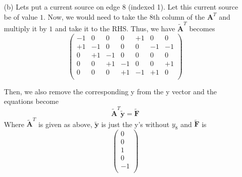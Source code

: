 \documentclass{article}
\newcommand{\mA}{\mathbf{A}}
\newcommand{\mC}{\mathbf{C}}
\newcommand{\mI}{\mathbf{I}}
\newcommand{\vy}{\mathbf{y}}
\newcommand{\vF}{\mathbf{F}}
\begin{document}
{\begin{itemize}
\[        \]
        Now we can see that we cannot write any column vector as a linear combination of the other column vectors. Therefore, the columns are independent.
        Matrix $\mC$ is a idenitity matrix since the resistors are all 1. Therefore, $\mC = \mI$.
        Therefore, $\tilde{\mA}^T \mC \tilde{\mA} = \tilde{\mA}^T \mI \tilde{\mA} = \tilde{\mA}^T \tilde{\mA}$ and this evaluates to 
        \[
            \begin{pmatrix}
            2 & -1 & 0 & 0 \\
            -1 & 4 & -1 & 0 \\
            0 & -1 & 3 & -1 \\
            0 & -1 & -1 & 3 \\
            \end{pmatrix}
        \]
        This is clearly symmetric. I then used Python to compute the eigen values of this matrix and found them to be $5, 2, 1, 4$. These are all positive and real, thus the matrix is positive definite.

        \item[(b)] Lets put a current source on edge 8 (indexed 1). Let this current source be of value $1$. Now, we would need to take the 8th column of the $\mA^T$ and multiply it by $1$ and take it to the RHS. Thus, we have $\tilde{\mA}^T$ becomes 
        \[
            \begin{pmatrix}
            -1 & 0 & 0 & 0 & +1 & 0 & 0 \\
            +1 & -1 & 0 & 0 & 0 & -1 & -1 \\
            0 & +1 & -1 & 0 & 0 & 0 & 0  \\
            0 & 0 & +1 & -1 & 0 & 0 & +1 \\
            0 & 0 & 0 & +1 & -1 & +1 & 0 \\
            \end{pmatrix}
        \]

        Then, we also remove the corresponding y from the y vector and the equations become
        \[\tilde{\mA}^T \tilde{\vy} = \tilde{\vF}\]
        Where $\tilde{\mA}^T$ is given as above, $\tilde{\vy}$ is just the y's without $y_8$ and $\tilde{\vF}$ is 
        \[
            \begin{pmatrix}
            0 \\
            0 \\
            1 \\
            0 \\
            -1 \\
            \end{pmatrix}
        \]


\end{itemize}}
\end{document}
